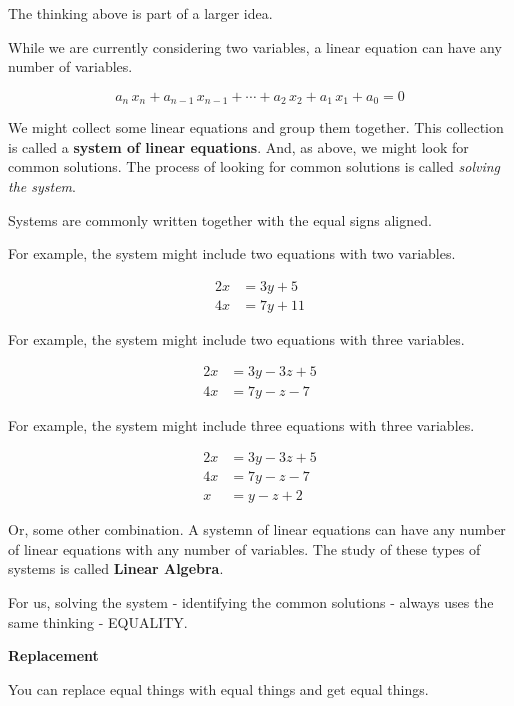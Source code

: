 \documentclass{ximera}
\begin{document}
The thinking above is part of a larger idea.


While we are currently considering two variables, a linear equation can have any number of variables.


\[
a_n \, x_n + a_{n-1} \, x_{n-1} + \cdots + a_2 \, x_2 + a_1 \, x_1 + a_0 = 0
\]


We might collect some linear equations and group them together. This collection is called a \textbf{system of linear equations}. And, as above, we might look for common solutions.  The process of looking for common solutions is called \textit{solving the system}.





Systems are commonly written together with the equal signs aligned.

For example, the system might include two equations with two variables.

\begin{align*}
2x & = 3y + 5 \\
4x & = 7y + 11
\end{align*}



For example, the system might include two equations with three variables.

\begin{align*}
2x & = 3y - 3z + 5 \\
4x & = 7y - z - 7
\end{align*}




For example, the system might include three equations with three variables.

\begin{align*}
2x & = 3y - 3z + 5 \\
4x & = 7y - z - 7 \\
x & = y - z + 2 
\end{align*}


Or, some other combination. A systemn of linear equations can have any number of linear equations with any number of variables.  The study of these types of systems is called \textbf{Linear Algebra}.

For us, solving the system - identifying the common solutions - always uses the same thinking - EQUALITY.



\begin{fact} \textbf{\textcolor{purple!85!blue}{Replacement}} 

You can replace equal things with equal things and get equal things.

\end{fact}
\end{document}
